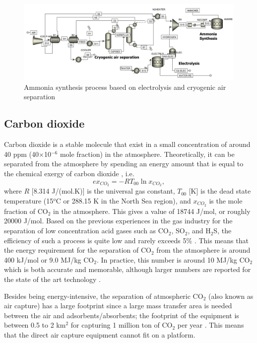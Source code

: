 \documentclass{ECOS_2021}
\begin{document}
\begin{figure}[H]
\includegraphics[width=14cm]{ammonia_cryogenic}

\caption{\label{fig:Ammonia-synthesis-cryogenic}Ammonia synthesis process
based on electrolysis and cryogenic air separation}
\end{figure}


\subsection{Carbon dioxide}

Carbon dioxide is a stable molecule that exist in a small concentration
of around 40 ppm (40$\times$10$^{-6}$ mole fraction) in the atmosphere.
Theoretically, it can be separated from the atmosphere by spending
an energy amount that is equal to the chemical exergy of carbon dioxide
\cite{sankaranarayananEfficiencySustainabilityEnergy2010}, i.e.
\[
ex_{CO_{2}}=-RT_{00}\ln x_{CO_{2}},
\]
where $R$ {[}8.314 J/(mol.K){]} is the universal gas constant, $T_{00}$
{[}K{]} is the dead state temperature (15$^{o}$C or 288.15 K in the
North Sea region), and $x_{CO_{2}}$ is the mole fraction of CO$_{2}$
in the atmosphere. This gives a value of 18744 J/mol, or roughly 20000
J/mol. Based on the previous experiences in the gas industry for the
separation of low concentration acid gases such as CO$_{2}$, SO$_{2}$,
and H$_{2}$S, the efficiency of such a process is quite low and rarely
exceeds 5\% \cite{keithWhyCaptureCO22009a,mahmoudkhaniLowenergySodiumHydroxide2009}.
This means that the energy requirement for the separation of CO$_{2}$
from the atmosphere is around 400 kJ/mol or 9.0 MJ/kg CO$_{2}$. In
practice, this number is around 10 MJ/kg CO$_{2}$ which is both accurate
and memorable, although larger numbers are reported for the state
of the art technology \cite{internationalenergyagencyDirectAirCapture}.

Besides being energy-intensive, the separation of atmospheric CO$_{2}$
(also known as air capture) has a large footprint since a large mass
transfer area is needed between the air and adsorbents/absorbents;
the footprint of the equipment is between 0.5 to 2 km$^{2}$ for capturing
1 million ton of CO$_{2}$ per year \cite{DirectAirCapture2021,mcqueenCostAnalysisDirect2020}.
This means that the direct air capture equipment cannot fit on a platform.
\end{document}
